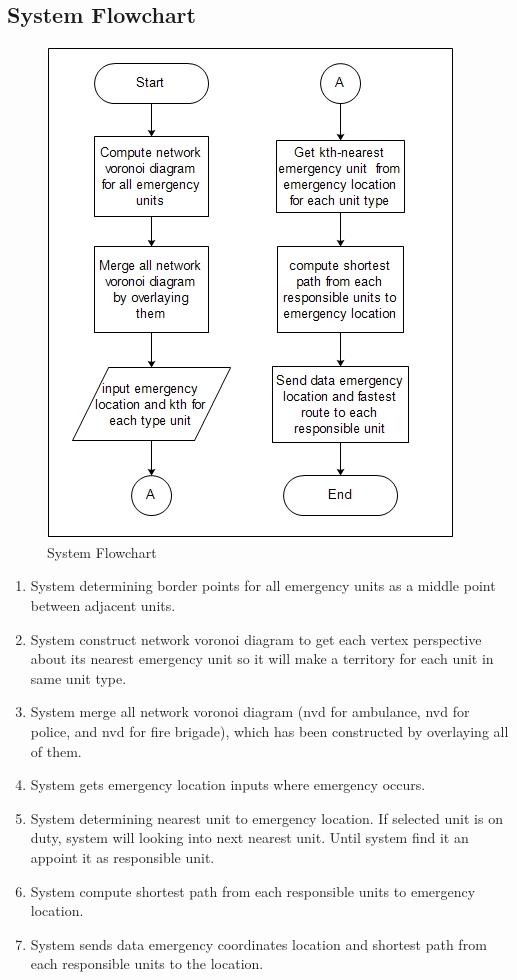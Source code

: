 \subsection{System Flowchart}

\begin{figure}[H]
    \centering
    \includegraphics[scale=0.7]{system-flow.jpg}
    \caption{System Flowchart}
    \label{fig:system_flowchart}
\end{figure}


\begin{enumerate}[leftmargin=*, topsep=5pt, itemsep=-1ex, partopsep=1ex, parsep=2ex]
	\item System determining border points for all emergency units as a middle point between adjacent units.
    \item System construct network voronoi diagram to get each vertex perspective about its nearest emergency unit so it will make a territory for each unit in same unit type.
    \item System merge all network voronoi diagram (nvd for ambulance, nvd for police, and nvd for fire brigade), which has been constructed by overlaying all of them.
    \item System gets emergency location inputs where emergency occurs.
    \item System determining nearest unit to emergency location. If selected unit is on duty, system will looking into next nearest unit. Until system find it an appoint it as responsible unit.
    \item System compute shortest path from each responsible units to emergency location.
    \item System sends data emergency coordinates location and shortest path from each responsible units to the location.
\end{enumerate}
\pagebreak


